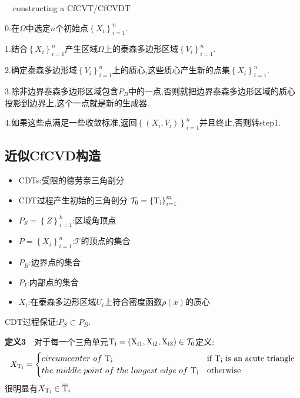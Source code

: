 \documentclass[9pt, a4paper,eqno]{article}
\theoremstyle{plain}
\begin{document}
\begin{CJK}{UTF8}{gkai}
\begin{algorithm}
 \caption{~~constructing a CfCVT/CfCVDT}

0.在$\Omega$中选定$n$个初始点$\left\lbrace X_i \right\rbrace_{i=1}^{n}$.

1.结合$\left\lbrace X_i \right\rbrace_{i=1}^{n}$产生区域$\Omega$上的泰森多边形区域$\left\lbrace V_i \right\rbrace _{i=1}^{n}$.

2.确定泰森多边形域$\left\lbrace V_i \right\rbrace_{i=1}^{n}$上的质心,这些质心产生新的点集$\left\lbrace X_i \right\rbrace_{i=1}^{n}$.

3.除非边界泰森多边形区域包含$P_B$中的一点,否则就把边界泰森多边形区域的质心投影到边界上,这个一点就是新的生成器.

4.如果这些点满足一些收敛标准,返回$\left\lbrace \left( X_i,V_i  \right)  \right\rbrace_{i=1}^{n}$并且终止,否则转step1.
\end{algorithm}
\subsection{近似CfCVD构造}
\begin{itemize}
\item CDTs:受限的德劳奈三角剖分
\item CDT过程产生初始的三角剖分 $\mathcal{T}_{0} = \left\lbrace \rm T _{i} \right\rbrace _{i=1}^{m}$
\item $P_S = \left\lbrace Z \right\rbrace _{i=1}^{k}$:区域角顶点
\item $P = \left\lbrace X_i \right\rbrace _{i=1}^{n}$:$\mathcal{T}$的顶点的集合
\item $P_B$:边界点的集合
\item $P_I$:内部点的集合
\item $\overline{X}_i$:在泰森多边形区域$U_i$上符合密度函数$\rho(x)$的质心
\end{itemize}
CDT过程保证:$P_S \subset P_B.$

{\bf 定义3}~~对于每一个三角单元$\rm T_{i} = \left( X_{i1},X_{i2},X_{i3} \right) \in \mathcal{T}_{0}$定义:
\begin{equation}
    X_{\rm T_i}=
   \begin{cases}
   circumcenter~of~\rm T_i &\mbox{if $\rm T_i$ is an acute triangle}\\
   the~middle~point~of~the~longest~edge~of~\rm T_i&\mbox{otherwise}
   \end{cases}
\end{equation}
很明显有$X_{\rm T_i} \in \overline{\rm T}_{i}$


\end{CJK}
\end{document}
